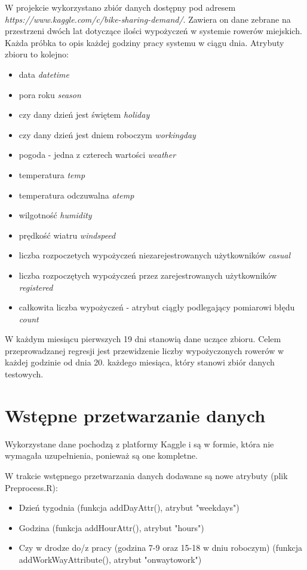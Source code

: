\documentclass[a4paper,12pt]{article}
\begin{document}
W projekcie wykorzystano zbiór danych dostępny pod adresem \textit{https://www.kaggle.com/c/bike-sharing-demand/}. Zawiera on dane zebrane na przestrzeni dwóch lat dotyczące ilości wypożyczeń w systemie rowerów miejskich. Każda próbka to opis każdej godziny pracy systemu w ciągu dnia. Atrybuty zbioru to kolejno:
\begin{itemize}
	\item data \textit{datetime}
	\item pora roku \textit{season}
	\item czy dany dzień jest świętem \textit{holiday}
	\item czy dany dzień jest dniem roboczym \textit{workingday}
	\item pogoda - jedna z czterech wartości \textit{weather}
	\item temperatura \textit{temp}
	\item temperatura odczuwalna \textit{atemp}
	\item wilgotność \textit{humidity}
	\item prędkość wiatru \textit{windspeed}
	\item liczba rozpoczetych wypożyczeń niezarejestrowanych użytkowników \textit{casual}
	\item liczba rozpoczętych wypożyczeń przez zarejestrowanych użytkowników \textit{registered}
	\item całkowita liczba wypożyczeń - atrybut ciągły podlegający pomiarowi błędu \textit{count}
\end{itemize}

W każdym miesiącu pierwszych 19 dni stanowią dane uczące zbioru. Celem przeprowadzanej regresji jest przewidzenie liczby wypożyczonych rowerów w każdej godzinie od dnia 20. każdego miesiąca, który stanowi zbiór danych testowych.

\section{Wstępne przetwarzanie danych}
Wykorzystane dane pochodzą z platformy Kaggle i są w formie, która nie wymagała uzupełnienia, ponieważ są one kompletne.
 
W trakcie wstępnego przetwarzania danych dodawane są nowe atrybuty (plik Preprocess.R):
    \begin{itemize}
        \item
            Dzień tygodnia (funkcja addDayAttr(), atrybut "weekdays")
        \item
            Godzina (funkcja addHourAttr(), atrybut "hours")
        \item
            Czy w drodze do/z pracy (godzina 7-9 oraz 15-18 w dniu roboczym) (funkcja addWorkWayAttribute(), atrybut "onwaytowork")
    \end{itemize}
\end{document}
